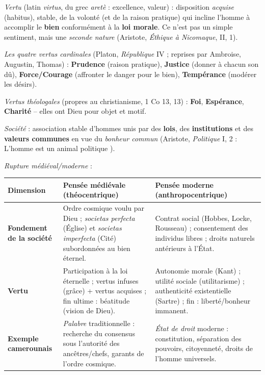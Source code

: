 \documentclass[11pt]{article}
\begin{document}
\begin{definition}
\emph{Vertu} (latin \emph{virtus}, du grec \emph{aretè} : excellence, valeur) : disposition \emph{acquise} (habitus), stable, de la volonté (et de la raison pratique) qui incline l'homme à accomplir le \textbf{bien} conformément à la \textbf{loi morale}. Ce n'est pas un simple sentiment, mais une \emph{seconde nature} (Aristote, \emph{Éthique à Nicomaque}, II, 1).
\par
\emph{Les quatre vertus cardinales} (Platon, \emph{République} IV ; reprises par Ambroise, Augustin, Thomas) : \textbf{Prudence} (raison pratique), \textbf{Justice} (donner à chacun son dû), \textbf{Force/Courage} (affronter le danger pour le bien), \textbf{Tempérance} (modérer les désirs).
\par
\emph{Vertus théologales} (propres au christianisme, 1 Co 13, 13) : \textbf{Foi}, \textbf{Espérance}, \textbf{Charité} -- elles ont Dieu pour objet et motif.
\par
\emph{Société} : association stable d'hommes unis par des \textbf{lois}, des \textbf{institutions} et des \textbf{valeurs communes} en vue du \emph{bonheur commun} (Aristote, \emph{Politique} I, 2 : \guillemotleft L'homme est un animal politique \guillemotright).
\par
\emph{Rupture médiéval/moderne} :
\begin{center}
\begin{tabularx}{\linewidth}{|l|X|X|}
\hline
\rowcolor{popblueL}
\textbf{Dimension} & \textbf{Pensée médiévale (théocentrique)} & \textbf{Pensée moderne (anthropocentrique)} \\
\hline
\bfseries Fondement de la société & Ordre cosmique voulu par Dieu ; \emph{societas perfecta} (Église) et \emph{societas imperfecta} (Cité) subordonnées au bien éternel. & Contrat social (Hobbes, Locke, Rousseau) ; consentement des individus libres ; droits naturels antérieurs à l'État. \\
\bfseries Vertu & Participation à la loi éternelle ; vertus infuses (grâce) + vertus acquises ; fin ultime : béatitude (vision de Dieu). & Autonomie morale (Kant) ; utilité sociale (utilitarisme) ; authenticité existentielle (Sartre) ; fin : liberté/bonheur immanent. \\
\bfseries Exemple camerounais & \emph{Palabre} traditionnelle : recherche du consensus sous l'autorité des ancêtres/chefs, garants de l'ordre cosmique. & \emph{État de droit} moderne : constitution, séparation des pouvoirs, citoyenneté, droits de l'homme universels. \\
\hline
\end{tabularx}
\end{center}
\end{definition}
\end{document}
